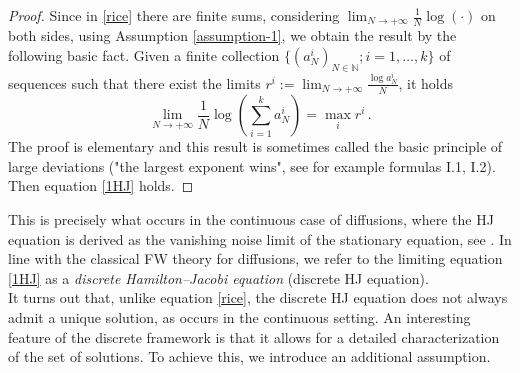 \documentclass[reqno]{amsart}
\theoremstyle{plain}
\theoremstyle{definition}
\theoremstyle{remark}
\numberwithin{equation}{section}
\numberwithin{theorem}{section}
\newcommand{\<}{\langle}
\renewcommand{\>}{\rangle}
\begin{document}
\begin{proof}
	Since in \eqref{rice} there are finite sums, considering $\lim_{N\to +\infty}\frac{1}{N}\log(\cdot)$ on both sides, using Assumption \ref{assumption-1}, we obtain the result by the following basic fact. Given a finite collection $\{\left(a^i_N\right)_{N\in\mathbb{N}};i=1,\ldots,k\}$ of sequences such that there exist the limits $r^i:=\lim_{N\to +\infty}\frac{\log a^i_N}{N}$, it holds 
		$$
		\lim_{N\to + \infty}\frac{1}{N}\log\left(\sum_{i=1}^ka^i_N\right)=\max_i r^i\,.
		$$
		 The proof is elementary and this result is sometimes called the basic principle of large deviations ("the largest exponent wins", see for example \cite{dH} formulas I.1, I.2). Then equation \eqref{1HJ} holds.
\end{proof}

This is precisely what occurs in the continuous case of diffusions, where the HJ equation is derived as the vanishing noise limit of the stationary equation, see \cite{FW}. In line with the classical FW theory for diffusions, we refer to the limiting equation \eqref{1HJ} as a \emph{discrete Hamilton–Jacobi equation} (discrete HJ equation).\\

It turns out that, unlike equation \eqref{rice}, the discrete HJ equation does not always admit a unique solution, as occurs in the continuous setting. An interesting feature of the discrete framework is that it allows for a detailed characterization of the set of solutions. To achieve this, we introduce an additional assumption.


\end{document}
